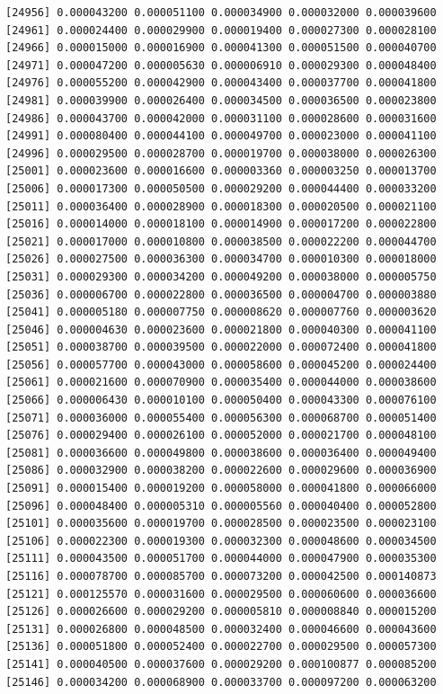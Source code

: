 \documentclass[]{article}
\begin{document}
\begin{verbatim}
[24956] 0.000043200 0.000051100 0.000034900 0.000032000 0.000039600
[24961] 0.000024400 0.000029900 0.000019400 0.000027300 0.000028100
[24966] 0.000015000 0.000016900 0.000041300 0.000051500 0.000040700
[24971] 0.000047200 0.000005630 0.000006910 0.000029300 0.000048400
[24976] 0.000055200 0.000042900 0.000043400 0.000037700 0.000041800
[24981] 0.000039900 0.000026400 0.000034500 0.000036500 0.000023800
[24986] 0.000043700 0.000042000 0.000031100 0.000028600 0.000031600
[24991] 0.000080400 0.000044100 0.000049700 0.000023000 0.000041100
[24996] 0.000029500 0.000028700 0.000019700 0.000038000 0.000026300
[25001] 0.000023600 0.000016600 0.000003360 0.000003250 0.000013700
[25006] 0.000017300 0.000050500 0.000029200 0.000044400 0.000033200
[25011] 0.000036400 0.000028900 0.000018300 0.000020500 0.000021100
[25016] 0.000014000 0.000018100 0.000014900 0.000017200 0.000022800
[25021] 0.000017000 0.000010800 0.000038500 0.000022200 0.000044700
[25026] 0.000027500 0.000036300 0.000034700 0.000010300 0.000018000
[25031] 0.000029300 0.000034200 0.000049200 0.000038000 0.000005750
[25036] 0.000006700 0.000022800 0.000036500 0.000004700 0.000003880
[25041] 0.000005180 0.000007750 0.000008620 0.000007760 0.000003620
[25046] 0.000004630 0.000023600 0.000021800 0.000040300 0.000041100
[25051] 0.000038700 0.000039500 0.000022000 0.000072400 0.000041800
[25056] 0.000057700 0.000043000 0.000058600 0.000045200 0.000024400
[25061] 0.000021600 0.000070900 0.000035400 0.000044000 0.000038600
[25066] 0.000006430 0.000010100 0.000050400 0.000043300 0.000076100
[25071] 0.000036000 0.000055400 0.000056300 0.000068700 0.000051400
[25076] 0.000029400 0.000026100 0.000052000 0.000021700 0.000048100
[25081] 0.000036600 0.000049800 0.000038600 0.000036400 0.000049400
[25086] 0.000032900 0.000038200 0.000022600 0.000029600 0.000036900
[25091] 0.000015400 0.000019200 0.000058000 0.000041800 0.000066000
[25096] 0.000048400 0.000005310 0.000005560 0.000040400 0.000052800
[25101] 0.000035600 0.000019700 0.000028500 0.000023500 0.000023100
[25106] 0.000022300 0.000019300 0.000032300 0.000048600 0.000034500
[25111] 0.000043500 0.000051700 0.000044000 0.000047900 0.000035300
[25116] 0.000078700 0.000085700 0.000073200 0.000042500 0.000140873
[25121] 0.000125570 0.000031600 0.000029500 0.000060600 0.000036600
[25126] 0.000026600 0.000029200 0.000005810 0.000008840 0.000015200
[25131] 0.000026800 0.000048500 0.000032400 0.000046600 0.000043600
[25136] 0.000051800 0.000052400 0.000022700 0.000029500 0.000057300
[25141] 0.000040500 0.000037600 0.000029200 0.000100877 0.000085200
[25146] 0.000034200 0.000068900 0.000033700 0.000097200 0.000063200

\end{verbatim}
\end{document}
